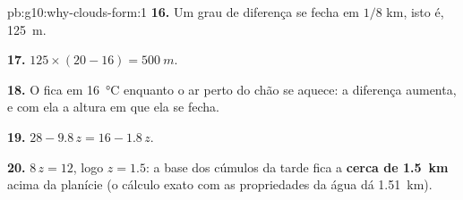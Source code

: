 \begin{solution}{pb:g10:why-clouds-form:1}
\textbf{16.} Um grau de diferença se fecha em $1/8$ km, isto é,
\qty{125}{m}.

\textbf{17.} $125 \times (20 - 16) = \qty{500}{m}$.

\textbf{18.} O  fica em \qty{16}{\degreeCelsius} enquanto o
ar perto do chão se aquece: a diferença aumenta, e com ela a altura em que
ela se fecha.

\textbf{19.} $28 - 9.8\,z = 16 - 1.8\,z$.

\textbf{20.} $8\,z = 12$, logo $z = 1.5$: a base dos cúmulos da tarde fica a
\textbf{cerca de \qty{1.5}{km}} acima da planície (o cálculo exato com as
propriedades da água dá \qty{1.51}{km}).
\end{solution}
